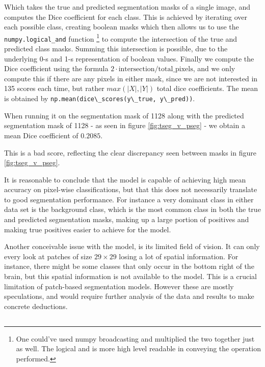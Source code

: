 Which takes the true and predicted segmentation masks of a single image, and computes the Dice coefficient for each class.
This is achieved by iterating over each possible class, creating boolean masks which then allows us to use the 
\texttt{numpy.logical\_and} function
\footnote{
	One could've used numpy broadcasting and multiplied the two together just as well.
	The logical and is more high level readable in conveying the operation performed.
}
to compute the intersection of the true and predicted class masks.
Summing this intersection is possible, due to the underlying 0-s and 1-s representation of boolean values.
Finally we compute the Dice coefficient using the formula $2 \cdot \text{intersection} / \text{total\_pixels}$,
and we only compute this if there are any pixels in either mask, since we are not interested
in 135 scores each time, but rather $max(|X|, |Y|)$ total dice coefficients.
The mean is obtained by \lstinline{np.mean(dice\_scores(y\_true, y\_pred))}.

When running it on the segmentation mask of 1128 along with the predicted segmentation mask of 1128 
- as seen in figure \ref{fig:tseg_v_pseg} - we obtain a mean Dice coefficient of $0.2085$.

This is a bad score, reflecting the clear discrepancy seen between masks in figure \ref{fig:tseg_v_pseg}.

It is reasonable to conclude that the model is capable of achieving high mean accuracy on pixel-wise classifications,
but that this does not necessarily translate to good segmentation performance.
For instance a very dominant class in either data set is the background class,
which is the most common class in both the true and predicted segmentation masks,
making up a large portion of positives and making true positives easier to achieve for the model.

Another conceivable issue with the model, is its limited field of vision.
It can only every look at patches of size $29\times 29$ losing a lot of spatial information.
For instance, there might be some classes that only occur in the bottom right of the brain,
but this spatial information is not available to the model.
This is a crucial limitation of patch-based segmentation models.
However these are mostly speculations, and would require further analysis of the data and results to make concrete deductions.

\subsection{} %

